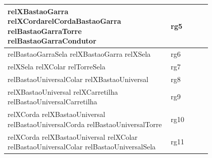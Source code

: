 \documentclass[12pt]{article}
\begin{document}
\begin{table}[H]
\begin{tabular}{|p{0.8\linewidth}|l|}
relXBastaoGarra relXCordarelCordaBastaoGarra relBastaoGarraTorre relBastaoGarraCondutor                                                                                                                                                                                                                                                      & rg5         \\ \hline
relBastaoGarraSela relXBastaoGarra relXSela                                                                                                                                                                                                                                                                                                 & rg6         \\ \hline
relXSela relXColar relTorreSela                                                                                                                                                                                                                                                                                                             & rg7         \\ \hline
relBastaoUniversalColar relXBastaoUniversal                                                                                                                                                                                                                                                                                                & rg8         \\ \hline
relXBastaoUniversal relXCarretilha relBastaoUniversalCarretilha                                                                                                                                                                                                                                                                             & rg9         \\ \hline
relXCorda relXBastaoUniversal relBastaoUniversalCorda relBastaoUniversalTorre                                                                                                                                                                                                                                                             & rg10        \\ \hline
relXCorda relXBastaoUniversal relXColar relBastaoUniversalColar relBastaoUniversalSela                                                                                                                                                                                                                                                    & rg11        \\ \hline

\end{tabular}
\end{table}
\end{document}
